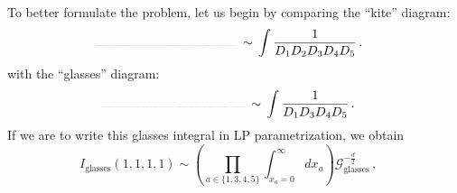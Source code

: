 \documentclass[17pt,margin=0.5in,innermargin=-2.5in,blockverticalspace=1cm]{tikzposter}
\begin{document}
\begin{columns}
{    To better formulate the problem, let us begin by comparing the ``kite'' diagram: 
    \begin{equation}
    \label{diag:kite}
    \nonumber
    \resizebox {4cm} {!} {
        \begin{tikzpicture}[baseline=(current bounding box.center)]
        \begin{feynman} 
            \vertex (a);
            \vertex [right=of a](b);
            \vertex [above right=of b](c);
            \vertex [below right=of b](e);
            \vertex [below right=of c](f);
            \vertex [right=of f](g);
            \diagram* {
                (a) -- (b),
                (c) -- [edge label=\(2\)] (e),
                (b) -- [quarter left, edge label=\(1\)] (c) -- [quarter left, edge label=\(5\)] (f),
                (b) -- [quarter right, edge label'=\(4\)] (e) -- [quarter right, edge label'=\(3\)] (f),
                (f) -- (g)
            }; 
        \end{feynman}
        \end{tikzpicture} 
    }    
        \, \sim \,
        \int \frac{1}{D_1 D_2 D_3 D_4 D_5}  \, .
    \end{equation} 
with the ``glasses'' diagram:
\begin{equation} 
\label{diag:glasses}
\nonumber
\resizebox {4cm} {!} {
    \begin{tikzpicture}[baseline=(current bounding box.center)]
        \begin{feynman}
        \vertex (a) ;
        \vertex [right=of a](b);
        \vertex [right=of b](c);
        \vertex [right=of c](d);
        \vertex [right=of d](e);
        \diagram* {
            (a) -- (b),
            (b) -- [half left, edge label=\(1\)] (c) -- [half left, edge label=\(4\)] (b),
            (c) -- [half right, edge label'=\(3\)] (d) -- [half right, edge label'=\(5\)] (c),
            (d) -- (e),
        };
    \end{feynman}
    \end{tikzpicture}
}
    \, \sim \, 
    \int \frac{1}{D_1 D_3 D_4 D_5} \, .
\end{equation}
If we are to write this glasses integral in LP parametrization, we obtain
\begin{equation} 
\label{eq:1111}
\nonumber
    I_{\text{glasses}}(1,1,1,1)
    \sim
    \left(\prod_{a \in \{1,3,4,5\}}
    \int_{x_a=0}^\infty dx_a
    \right)
    \mathcal{G}_{\text{glasses}}^{-\frac{d}{2}} \, ,

\end{equation}}
\end{columns}
\end{document}
